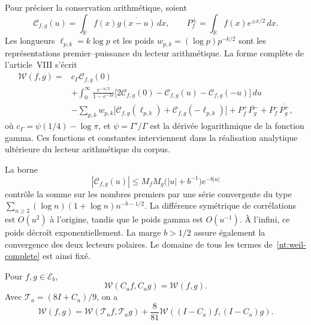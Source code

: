 Pour préciser la conservation arithmétique, soient
\[
 \mathcal C_{f,g}(u)
 =\int_{\mathbb R}f(x)\overline{g(x-u)}\,dx,
 \qquad
 P_f^\pm=\int_{\mathbb R}f(x)e^{\pm x/2}\,dx.
\]
Les longueurs \(\ell_{p,k}=k\log p\) et les poids \(w_{p,k}=(\log p)p^{-k/2}\) sont les représentations premier--puissance du lecteur arithmétique. La forme complète de l'article~VIII s'écrit
\begin{equation}
 \begin{split}
 \mathscr W(f,g)={}&c_\Gamma\mathcal C_{f,g}(0)\\
 &+\int_0^\infty\frac{e^{-u/2}}{1-e^{-2u}}
 \bigl[2\mathcal C_{f,g}(0)
       -\mathcal C_{f,g}(u)-\mathcal C_{f,g}(-u)\bigr]\,du\\
 &-\sum_{p,k}w_{p,k}
   \bigl[\mathcal C_{f,g}(\ell_{p,k})
        +\mathcal C_{f,g}(-\ell_{p,k})\bigr]
 +P_f^+\overline{P_g^-}+P_f^-\overline{P_g^+},
 \end{split}
 \label{nt:weil-complete}
\end{equation}
où \(c_\Gamma=\psi(1/4)-\log\pi\), et \(\psi=\Gamma'/\Gamma\) est la dérivée logarithmique de la fonction gamma. Ces fonctions et constantes interviennent dans la réalisation analytique ultérieure du lecteur arithmétique du corpus.

La borne
\[
 |\mathcal C_{f,g}(u)|
 \leq M_fM_g\bigl(|u|+b^{-1}\bigr)e^{-b|u|}
\]
contrôle la somme sur les nombres premiers par une série convergente du type
\(\sum_{n\geq2}(\log n)(1+\log n)n^{-b-1/2}\).
La différence symétrique de corrélations est \(O(u^2)\)
à l’origine, tandis que le poids gamma est \(O(u^{-1})\).
À l’infini, ce poids décroît exponentiellement.
La marge \(b>1/2\) assure également la convergence des
deux lecteurs polaires. Le domaine
de tous les termes de~\eqref{nt:weil-complete} est ainsi fixé.

\begin{proposition}
Pour \(f,g\in\mathscr E_b\),
\begin{equation}
 \mathscr W(C_af,C_ag)=\mathscr W(f,g).
 \label{nt:weil-invariance}
\end{equation}
Avec \(\mathcal T_a=(8I+C_a)/9\), on a
\begin{equation}
 \mathscr W(f,g)
 =\mathscr W(\mathcal T_af,\mathcal T_ag)
 +\frac8{81}\mathscr W((I-C_a)f,(I-C_a)g).
 \label{nt:weil-balance}
\end{equation}
\end{proposition}

